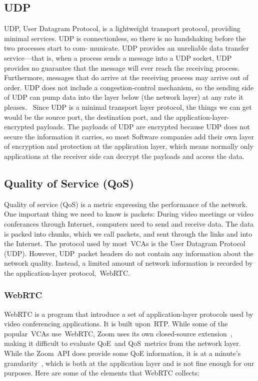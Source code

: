     \subsection{UDP}\label{introduction:qos:udp}
        UDP, User Datagram Protocol, is a lightweight transport protocol, providing minimal services. UDP is connectionless, so there is no handshaking before the two processes start to com- municate. UDP provides an unreliable data transfer service—that is, when a process sends a message into a UDP socket, UDP provides no guarantee that the message will ever reach the receiving process. Furthermore, messages that do arrive at the receiving process may arrive out of order. UDP does not include a congestion-control mechanism, so the sending side of UDP can pump data into the layer below (the network layer) at any rate it pleases.~\autocite{alma990025667610203776} Since UDP is a minimal transport layer protocol, the things we can get would be the source port, the destination port, and the application-layer-encrypted payloads. The payloads of UDP are encrypted because UDP does not secure the information it carries, so most Software companies add their own layer of encryption and protection at the application layer, which means normally only applications at the receiver side can decrypt the payloads and access the data. 


    \subsection{Quality of Service (QoS)}\label{introduction:qos}
        Quality of service (QoS) is a metric expressing the performance of the network. One important thing we need to know is packets: During video meetings or video conferances through Internet, computers need to send and receive data. The data is packed into chunks, which we call packets, and sent through the links and into the Internet. The protocol used by most~VCAs is the User Datagram Protocol (UDP). However, UDP~packet headers do not contain any information about the network quality. Instead, a limited amount of network information is recorded by the application-layer protocol,~WebRTC.

        \subsubsection{WebRTC}\label{introduction:qos:webrtc}
            WebRTC is a program that introduce a set of application-layer protocols used by video conferencing applications. It is built upon~RTP. While some of the popular~VCAs use~WebRTC, Zoom uses its own closed-source extension~\autocite{marczak2020}, making it difficult to evaluate QoE~and QoS~metrics from the network layer. While the Zoom~API does provide some QoE information, it is at a minute's granularity~\autocite{walia2019}, which is both at the application layer and is not fine enough for our purposes. Here are some of the elements that WebRTC collects:

